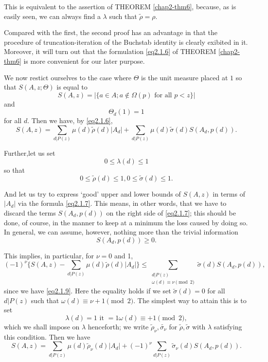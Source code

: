 This is equivalent to the assertion of THEOREM \ref{chap2-thm6}, because, as is
easily seen, we can always find a $\lambda$ such that $\tilde{\rho}=
\rho$. 

Compared with the first, the second proof has an advantage in that the
procedure of truncation-iteration of the Buchstab identity is clearly
exibited in it. Moreover, it will turn out that the formulation
\eqref{eq2.1.6} of THEOREM \ref{chap2-thm6} is more convenient for our
later purpose.  

We now restict ourselves to the case where $\Theta$ is the unit
measure placed at $1$ so that $S(A,z; \Theta)$ is equal to  
$$
S(A,z)= | \{ a \in A; a \notin \Omega(p) \text{ for all } p < z\}|
$$
and  
$$
\Theta_d(1)=1
$$
for all $d$. Then we have, by \eqref{eq2.1.6},
\begin{equation*}
  S(A,z)= \sum_{d|P(z)} \mu(d) \tilde{\rho}(d)|A_d| + \sum_{d|P(z)}
  \mu(d) \tilde{\sigma}(d)S(A_d,p(d)). \tag{2.1.7} \label{eq2.1.7}
\end{equation*} 
 
Further,\pageoriginale let us set
 \begin{equation*}
   0 \le \lambda(d) \le 1 \tag{2.1.8}\label{eq2.1.8}
 \end{equation*} 
 so that
 \begin{equation*}
0 \le \tilde{\rho}(d) \le 1, 0 \le \tilde{\sigma}(d) \le
1. \tag{2.1.9}\label{eq2.1.9} 
 \end{equation*} 
 
 And let us try to express `good' upper and lower bounds of $S(A,z)$
 in terms of $|A_d|$ via the formula \eqref{eq2.1.7}. This means, in other
 words, that we have to discard the terms $S(A_d, p(d))$ on the right
 side of \eqref{eq2.1.7}; this should be done, of course, in the manner to
 keep at a minimum the loss caused by doing so. In general, we can
 assume, however, nothing more than the trivial information 
 $$
 S(A_d,p(d)) \ge 0.
 $$ 
 
 This implies, in particular, for $\nu =0$ and 1,
 $$
 (-1)^{\nu} \{S(A,z)- \sum_{d|P(z)} \mu (d) \tilde{\rho}(d) |A_d|\}
 \le \sum_{\substack{d|P(z)\\ \omega(d) \equiv \nu \pmod{2}}}
 \tilde{\sigma}(d)S(A_d,p(d)), 
 $$
 since we have \eqref{eq2.1.9}. Here the equality holds if we set
 $\tilde{\sigma}(d) =0$ for all $d|P(z)$ such that $\omega(d) \equiv
 \nu +1\pmod{2}$. The simplest way to attain this is to set  
 \begin{equation*}
   \lambda(d) =1 \text{ it } =1 \omega(d) \equiv +1 \pmod{2},
   \tag{2.1.10}\label{eq2.1.10} 
 \end{equation*}
 which we shall impose on $\lambda$ henceforth; we write
 $\tilde{\rho}_\nu, \tilde{\sigma_\nu}$ for $\tilde{\rho},
 \tilde{\sigma}$ with $\lambda$ satisfying this condition. Then we
 have  
 \begin{equation*}
   S(A,z)= \sum_{d|P(z)} \mu(d) \tilde{\rho}_\nu (d)|A_d| + (-1)^\nu
   \sum_{d|P(z)} \tilde{\sigma}_\nu(d)
   S(A_d,p(d)). \tag{2.1.11} \label{eq2.1.11} 
  \end{equation*}  
  
